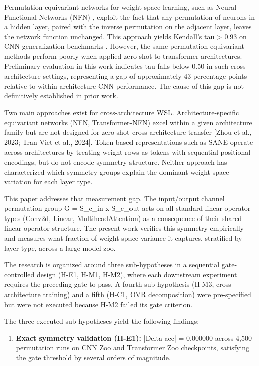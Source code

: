 
Permutation equivariant networks for weight space learning, such as Neural Functional Networks (NFN) \citep{Zhouetal2023}, exploit the fact that any permutation of neurons in a hidden layer, paired with the inverse permutation on the adjacent layer, leaves the network function unchanged. This approach yields Kendall's tau > 0.93 on CNN generalization benchmarks \citep{Zhouetal2023}. However, the same permutation equivariant methods perform poorly when applied zero-shot to transformer architectures. Preliminary evaluation in this work indicates tau falls below 0.50 in such cross-architecture settings, representing a gap of approximately 43 percentage points relative to within-architecture CNN performance. The cause of this gap is not definitively established in prior work.

Two main approaches exist for cross-architecture WSL. Architecture-specific equivariant networks (NFN, Transformer-NFN) excel within a given architecture family but are not designed for zero-shot cross-architecture transfer [Zhou et al., 2023; Tran-Viet et al., 2024]. Token-based representations such as SANE \citep{Schurholtetal2024} operate across architectures by treating weight rows as tokens with sequential positional encodings, but do not encode symmetry structure. Neither approach has characterized which symmetry groups explain the dominant weight-space variation for each layer type.

This paper addresses that measurement gap. The input/output channel permutation group G = S_{c_in} x S_{c_out} acts on all standard linear operator types (Conv2d, Linear, MultiheadAttention) as a consequence of their shared linear operator structure. The present work verifies this symmetry empirically and measures what fraction of weight-space variance it captures, stratified by layer type, across a large model zoo.

The research is organized around three sub-hypotheses in a sequential gate-controlled design (H-E1, H-M1, H-M2), where each downstream experiment requires the preceding gate to pass. A fourth sub-hypothesis (H-M3, cross-architecture training) and a fifth (H-C1, OVR decomposition) were pre-specified but were not executed because H-M2 failed its gate criterion.

The three executed sub-hypotheses yield the following findings:

\begin{enumerate}
\item \textbf{Exact symmetry validation (H-E1):} |Delta acc| = 0.000000 across 4,500 permutation runs on CNN Zoo and Transformer Zoo checkpoints, satisfying the gate threshold by several orders of magnitude.
\end{enumerate}

